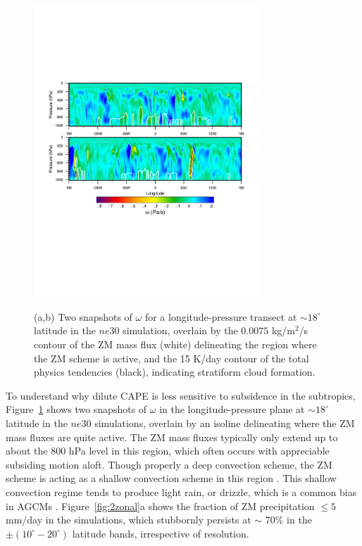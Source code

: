 \documentclass[times]{qjrms4}
\begin{document}
\begin{figure}
\begin{center}
\noindent\includegraphics[width=20pc,angle=0]{figs/temp_trans.pdf}\\
\end{center}
\caption{(a,b) Two snapshots of $\omega$ for a longitude-pressure transect at $\sim 18^{\circ}$ latitude in the $ne30$ simulation, overlain by the $0.0075$ kg/m$^2$/s contour of the ZM mass flux (white) delineating the region where the ZM scheme is active, and the 15 K/day contour of the total physics tendencies (black), indicating stratiform cloud formation.}
\label{fig:transect}
\end{figure}

To understand why dilute CAPE is less sensitive to subsidence in the subtropics, Figure~\ref{fig:transect} shows two snapshots of $\omega$ in the longitude-pressure plane at  $\sim 18^{\circ}$ latitude in the $ne30$ simulations, overlain by an isoline delineating where the ZM mass fluxes are quite active. The ZM mass fluxes typically only extend up to about the 800 hPa level in this region, which often occurs with appreciable subsiding motion aloft. Though properly a deep convection scheme, the ZM scheme is acting as a shallow convection scheme in this region \citep{TETAL2016AGU}. This shallow convection regime tends to produce light rain, or drizzle, which is a common bias in AGCMs \citep{D2006JCLIM}. Figure~\ref{fig:2zonal}a shows the fraction of ZM precipitation $\leq 5$ mm/day in the simulations, which stubbornly persists at $\sim$ 70\% in the $\pm \left(10^{\circ}-20^{\circ} \right)$ latitude bands, irrespective of resolution.
\end{document}
